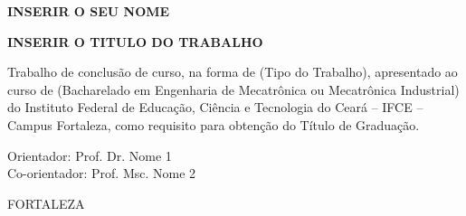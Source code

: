 
\fontsize{12}{12}							%
\vspace{3cm}								%
\begin{center}								%
\textbf{INSERIR O SEU NOME}\\				%
\vspace{8cm}								%
							
\textbf{INSERIR O TITULO DO TRABALHO}\\		%
\vspace{3cm}								%
\end{center}								%

\begin{flushright}
\begin{minipage}[15cm] {11cm}
Trabalho de conclusão de curso, na forma de (Tipo do Trabalho), apresentado ao curso de (Bacharelado em Engenharia de Mecatrônica ou Mecatrônica Industrial) do Instituto Federal de Educação, Ciência e Tecnologia do Ceará -- IFCE -- Campus Fortaleza, como requisito para obtenção do Título de Graduação.

\vspace{1cm}
\noindent
Orientador: Prof. Dr. Nome 1\\
Co-orientador: Prof. Msc. Nome 2
\end{minipage}
\end{flushright}
\vspace{6cm}
\begin{center}
FORTALEZA\\
\the\year{}
\end{center}